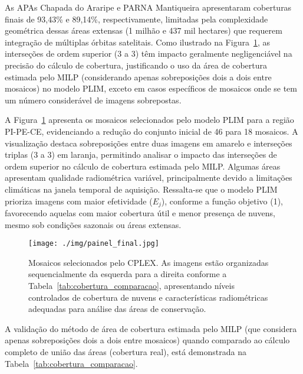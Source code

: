 \documentclass[a4paper,11pt]{article}
\begin{document}
As APAs Chapada do Araripe e PARNA Mantiqueira apresentaram coberturas finais de 93,43\% e 89,14\%, respectivamente, limitadas pela complexidade geométrica dessas áreas extensas (1 milhão e 437 mil hectares) que requerem integração de múltiplas órbitas satelitais. Como ilustrado na Figura~\ref{fig:intersecoes}, as interseções de ordem superior ($3$ a $3$) têm impacto geralmente negligenciável na precisão do cálculo de cobertura, justificando o uso da área de cobertura estimada pelo MILP (considerando apenas sobreposições dois a dois entre mosaicos) no modelo PLIM, exceto em casos específicos de mosaicos onde se tem um número considerável de imagens sobrepostas.

A Figura~\ref{fig:intersecoes} apresenta os mosaicos selecionados pelo modelo PLIM para a região PI-PE-CE, evidenciando a redução do conjunto inicial de 46 para 18 mosaicos. A visualização destaca sobreposições entre duas imagens em amarelo e interseções triplas ($3$ a $3$) em laranja, permitindo analisar o impacto das interseções de ordem superior no cálculo de cobertura estimada pelo MILP. Algumas áreas apresentam qualidade radiométrica variável, principalmente devido a limitações climáticas na janela temporal de aquisição. Ressalta-se que o modelo PLIM prioriza imagens com maior efetividade ($E_j$), conforme a função objetivo (1), favorecendo aquelas com maior cobertura útil e menor presença de nuvens, mesmo sob condições sazonais ou áreas extensas.

\begin{figure}[H]
    \centering
    \texttt{[image: ./img/painel\_final.jpg]}
\caption{Mosaicos selecionados pelo CPLEX. As imagens estão organizadas sequencialmente da esquerda para a direita conforme a Tabela~\ref{tab:cobertura_comparacao}, apresentando níveis controlados de cobertura de nuvens e características radiométricas adequadas para análise das áreas de conservação.}
    \label{fig:intersecoes}
\end{figure}

\vspace{-5mm}
A validação do método de área de cobertura estimada pelo MILP (que considera apenas sobreposições dois a dois entre mosaicos) quando comparado ao cálculo completo de união das áreas (cobertura real), está demonstrada na Tabela~\ref{tab:cobertura_comparacao}.
\end{document}

